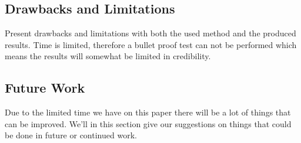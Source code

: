 \documentclass[runningheads,a4paper,oribibl]{llncs}
\begin{document}
\subsection{Drawbacks and Limitations}
Present drawbacks and limitations with both the used method and the produced results. Time is limited, therefore a bullet proof test can not be performed which means the results will somewhat be limited in credibility.

\subsection{Future Work}
Due to the limited time we have on this paper there will be a lot of things that can be improved. We'll in this section give our suggestions on things that could be done in future or continued work.

%
\nocite{*}  %

%
%
% 
%


\end{document}
